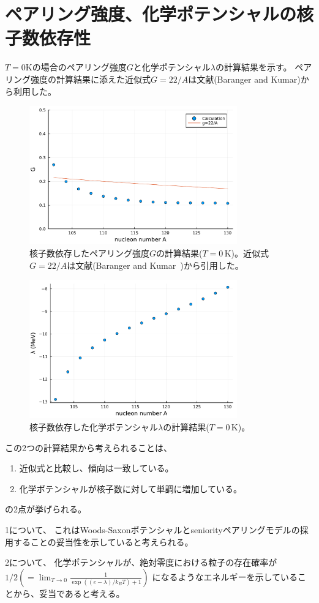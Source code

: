 \documentclass[a4paper,11pt]{jsreport}
\begin{document}
  \section{ペアリング強度、化学ポテンシャルの核子数依存性}
  \(T=0\)Kの場合のペアリング強度\(G\)と化学ポテンシャル\(\lambda\)の計算結果を示す。
  ペアリング強度の計算結果に添えた近似式\(G=22/A\)は文献(Baranger and Kumar\cite{baranger1968nuclear})から利用した。
  \begin{figure}[H]
    \centering
    \includegraphics[width=0.8\textwidth]{main_fig/G_vs_A.pdf}
    \caption{核子数依存したペアリング強度$G$の計算結果($T=0$\,K)。近似式$G=22/A$は文献(Baranger and Kumar~\cite{baranger1968nuclear})から引用した。}
  \end{figure}
  \begin{figure}[H]
    \centering
    \includegraphics[width=0.8\textwidth]{main_fig/lambda_vs_A.pdf}
    \caption{核子数依存した化学ポテンシャル$\lambda$の計算結果($T=0$\,K)。}
  \end{figure}
  この2つの計算結果から考えられることは、
  \begin{enumerate}
    \item 近似式と比較し、傾向は一致している。
    \item 化学ポテンシャルが核子数に対して単調に増加している。
  \end{enumerate}
  の2点が挙げられる。\par
  1について、
  これはWoods-Saxonポテンシャルとseniorityペアリングモデルの採用することの妥当性を示していると考えられる。\par
  2について、
  化学ポテンシャルが、絶対零度における粒子の存在確率が\(1/2(=\lim_{T\rightarrow0}\frac{1}{\exp((e-\lambda)/k_B T)+1})\)
  になるようなエネルギーを示していることから、妥当であると考える。
\end{document}
